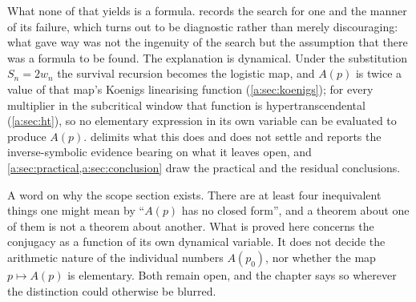 What none of that yields is a formula.  records the search for one
and the manner of its failure, which turns out to be diagnostic rather than merely
discouraging: what gave way was not the ingenuity of the search but the assumption
that there was a formula to be found. The explanation is dynamical. Under the
substitution $S_n = 2w_n$ the survival
recursion becomes the logistic map, and $A(p)$ is twice a value of that map's
Koenigs linearising function (\cref{a:sec:koenigs}); for every multiplier in the
subcritical window that function is hypertranscendental (\cref{a:sec:ht}), so no
elementary expression in its own variable can be evaluated to produce $A(p)$.
 delimits what this does and does not settle and reports the
inverse-symbolic evidence bearing on what it leaves open, and
\cref{a:sec:practical,a:sec:conclusion} draw the practical and the residual
conclusions.

A word on why the scope section exists. There are at least four inequivalent things
one might mean by ``$A(p)$ has no closed form'', and a theorem about one of them is
not a theorem about another. What is proved here concerns the conjugacy as a
function of its own dynamical variable. It does not decide the arithmetic nature of
the individual numbers $A(p_0)$, nor whether the map $p\mapsto A(p)$ is elementary.
Both remain open, and the chapter says so wherever the distinction could otherwise
be blurred.
